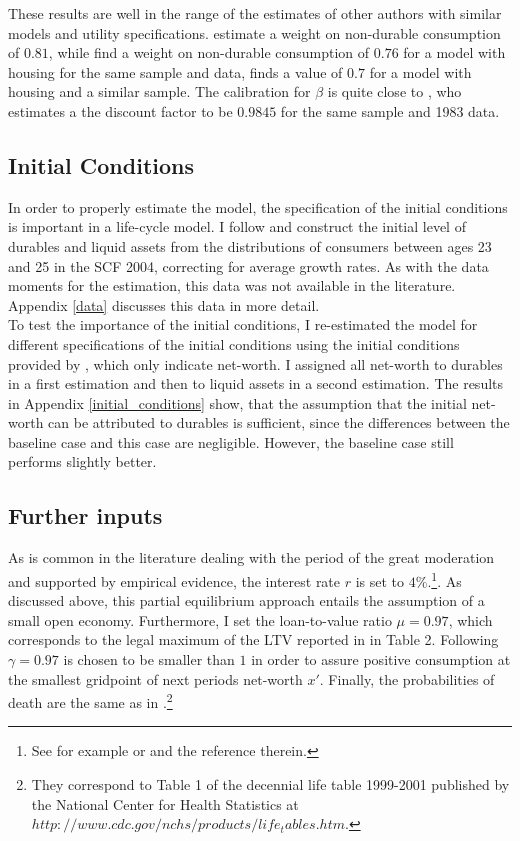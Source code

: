 \documentclass[12pt,a4paper,leqno]{article}
\theoremstyle{definition}
\begin{document}
These results are well in the range of the estimates of other authors with similar models and utility specifications. \cite{FV&K2011} estimate a weight on non-durable consumption of $0.81$, while \cite{hintermaier2016} find a weight on non-durable consumption of $0.76$ for a model with housing for the same sample and data, \cite{gruber2003precautionary} finds a value of $0.7$ for a model with housing and a similar sample.
The calibration for $\beta$ is quite close to \cite{hintermaier2011}, who estimates a the discount factor to be $0.9845$ for the same sample and 1983 data. 

\subsection{Initial Conditions}
In order to properly estimate the model, the specification of the initial conditions is important in a life-cycle model. I follow \cite{hintermaier2011} and construct the initial level of durables and liquid assets from the distributions of consumers between ages 23 and 25 in the SCF 2004, correcting for average growth rates. As with the data moments for the estimation, this data was not available in the literature. Appendix \ref{data} discusses this data in more detail. \\
To test the importance of the initial conditions, I re-estimated the model for different specifications of the initial conditions using the initial conditions provided by \cite{hintermaier2011}, which only indicate net-worth. I assigned all net-worth to durables in a first estimation and then to liquid assets in a second estimation. The results in Appendix \ref{initial_conditions} show, that the assumption that the initial net-worth can be attributed to durables is sufficient, since the differences between the baseline case and this case are negligible. However, the baseline case still performs slightly better. 

\subsection{Further inputs}

As is common in the literature dealing with the period of the great moderation and supported by empirical evidence, the interest rate $r$ is set to $4\%$.\footnote{See for example \citep{FV&K2011} or \cite{hintermaier2011} and the reference therein.}. As discussed above, this partial equilibrium approach entails the assumption of a small open economy. Furthermore, I set the loan-to-value ratio $\mu = 0.97$, which corresponds to the legal maximum of the LTV reported in \cite{green2005american} in Table 2. Following \cite{hintermaier2010} $\gamma = 0.97$ is chosen to be smaller than $1$ in order to assure positive consumption at the smallest gridpoint of next periods net-worth $x'$. Finally, the probabilities of death are the same as in \cite{hintermaier2011}.\footnote{They correspond to Table 1 of the decennial life table 1999-2001 published by the National Center for Health Statistics at $http://www.cdc.gov/nchs/products/life_tables.htm$.} 
\end{document}
